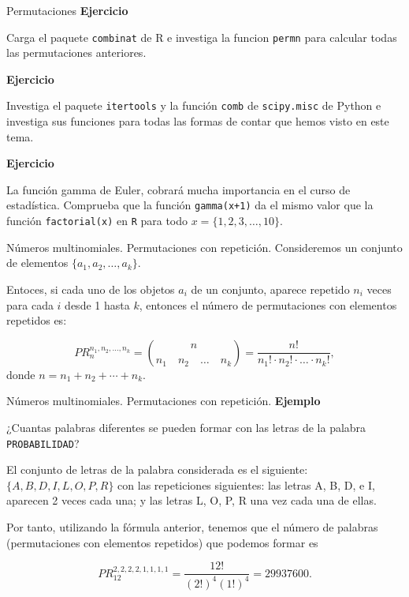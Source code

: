 \documentclass[
  ignorenonframetext,
  aspectratio=169]{beamer}
\begin{document}
\begin{frame}[fragile]{Permutaciones}
\protect\hypertarget{permutaciones-2}{}
\textbf{Ejercicio}

Carga el paquete \texttt{combinat} de R e investiga la funcion
\texttt{permn} para calcular todas las permutaciones anteriores.

\textbf{Ejercicio}

Investiga el paquete \texttt{itertools} y la función \texttt{comb} de
\texttt{scipy.misc} de Python e investiga sus funciones para todas las
formas de contar que hemos visto en este tema.

\textbf{Ejercicio}

La función gamma de Euler, cobrará mucha importancia en el curso de
estadística. Comprueba que la función \texttt{gamma(x+1)} da el mismo
valor que la función \texttt{factorial(x)} en \texttt{R} para todo
\(x = \{1,2,3,\ldots,10\}\).
\end{frame}

\begin{frame}{Números multinomiales. Permutaciones con repetición.}
\protect\hypertarget{nuxfameros-multinomiales.-permutaciones-con-repeticiuxf3n.}{}
Consideremos un conjunto de elementos \(\{a_1, a_2, \ldots, a_k\}\).

Entoces, si cada uno de los objetos \(a_i\) de un conjunto, aparece
repetido \(n_i\) veces para cada \(i\) desde 1 hasta \(k\), entonces el
número de permutaciones con elementos repetidos es:

\[PR_n^{n_1,n_2,\ldots,n_k} = {{n}\choose {n_1\quad n_2 \quad\ldots \quad n_k}}=\frac{n!}{n_1!\cdot n_2!\cdot \ldots \cdot n_k!},\]
donde \(n=n_1+n_2+\cdots+n_k\).
\end{frame}

\begin{frame}[fragile]{Números multinomiales. Permutaciones con
repetición.}
\protect\hypertarget{nuxfameros-multinomiales.-permutaciones-con-repeticiuxf3n.-1}{}
\textbf{Ejemplo}

¿Cuantas palabras diferentes se pueden formar con las letras de la
palabra \texttt{PROBABILIDAD}?

El conjunto de letras de la palabra considerada es el siguiente:
\(\{A, B, D, I, L, O, P, R\}\) con las repeticiones siguientes: las
letras A, B, D, e I, aparecen 2 veces cada una; y las letras L, O, P, R
una vez cada una de ellas.

Por tanto, utilizando la fórmula anterior, tenemos que el número de
palabras (permutaciones con elementos repetidos) que podemos formar es

\[PR^{2,2,2,2,1,1,1,1}_{12} = \frac{12!}{(2!)^4(1!)^4} = 29937600.\]
\end{frame}
\end{document}
